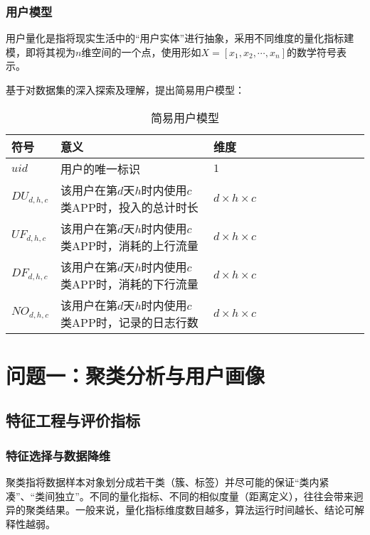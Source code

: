 \documentclass[withoutpreface,bwprint]{cumcmthesis}
\begin{document}
\subsubsection{用户模型}

用户量化是指将现实生活中的“用户实体”进行抽象，采用不同维度的量化指标建模，即将其视为$n$维空间的一个点，使用形如$X=[x_1, x_2, \cdots , x_n]$的数学符号表示。

基于对数据集的深入探索及理解，提出简易用户模型：

\begin{table}[!htbp]
    \caption{简易用户模型}\label{tab:002} \centering
    \begin{tabular}{lllllrlrlrrr}
        \toprule[1.5pt]
        符号             & 意义                               & 维度                   \\
        \midrule[1pt]
        $uid$          & 用户的唯一标识                          & $1$                  \\
        $DU_{d, h, c}$ & 该用户在第$d$天$h$时内使用$c$类APP时，投入的总计时长 & $d\times h \times c$ \\
        $UF_{d, h, c}$ & 该用户在第$d$天$h$时内使用$c$类APP时，消耗的上行流量 & $d\times h \times c$ \\
        $DF_{d, h, c}$ & 该用户在第$d$天$h$时内使用$c$类APP时，消耗的下行流量 & $d\times h \times c$ \\
        $NO_{d, h, c}$ & 该用户在第$d$天$h$时内使用$c$类APP时，记录的日志行数 & $d\times h \times c$ \\
        \bottomrule[1.5pt]
    \end{tabular}
\end{table}

\section{问题一：聚类分析与用户画像}

\subsection{特征工程与评价指标}

\subsubsection{特征选择与数据降维}

聚类指将数据样本对象划分成若干类（簇、标签）并尽可能的保证“类内紧凑”、“类间独立”\cite{数据仓库与数据挖掘}。不同的量化指标、不同的相似度量（距离定义），往往会带来迥异的聚类结果。一般来说，量化指标维度数目越多，算法运行时间越长、结论可解释性越弱。
\end{document}
